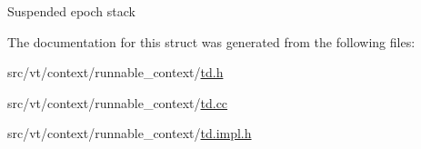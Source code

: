 Suspended epoch stack 

The documentation for this struct was generated from the following files\+:\begin{DoxyCompactItemize}
\item 
src/vt/context/runnable\+\_\+context/\hyperlink{td_8h}{td.\+h}\item 
src/vt/context/runnable\+\_\+context/\hyperlink{td_8cc}{td.\+cc}\item 
src/vt/context/runnable\+\_\+context/\hyperlink{td_8impl_8h}{td.\+impl.\+h}\end{DoxyCompactItemize}
